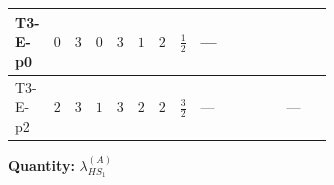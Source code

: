 \documentclass[8pt]{article}
\begin{document}
\begin{landscape}
\begin{longtable}{@{}llcccccc >{\raggedright\arraybackslash}p{0.21\linewidth} >{\raggedright\arraybackslash}p{0.21\linewidth} >{\raggedright\arraybackslash}p{0.21\linewidth}@{}}
\midrule
T3-E-p0 & $0$ & $3$ & $0$ & $3$ & $1$ & $2$ & $\frac{1}{2}$ & --- & \scriptsize\adjustbox{max width=\linewidth}{$\begin{gathered} -\frac{33 {g_2}^2 {\lambda_{HS_1}^{(A)}}}{2}\end{gathered}$} & \scriptsize\adjustbox{max width=\linewidth}{$\begin{gathered} -\frac{3 {g_1}^2 {\lambda_{HS_1}^{(A)}}}{2}\end{gathered}$} \\
\midrule
T3-E-p2 & $2$ & $3$ & $1$ & $3$ & $2$ & $2$ & $\frac{3}{2}$ & --- & \scriptsize\adjustbox{max width=\linewidth}{$\begin{gathered} -\frac{33 {g_2}^2 {\lambda_{HS_1}^{(A)}}}{2}\end{gathered}$} & --- \\
\midrule
\bottomrule
\end{longtable}
\clearpage
\noindent\textbf{Quantity: }$\lambda_{HS_1}^{(A)}$\par\smallskip

\end{landscape}
\end{document}

